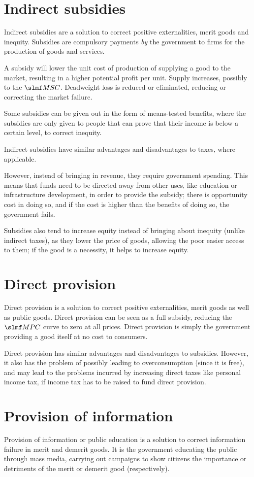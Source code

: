 \documentclass[Economics.tex]{subfiles}
\begin{document}
\section{Indirect subsidies}
Indirect subsidies are a solution to correct positive externalities, merit goods and inequity. Subsidies are compulsory payments \emph{by} the government to firms for the production of goods and services.

A subsidy will lower the unit cost of production of supplying a good to the market, resulting in a higher potential profit per unit. Supply increases, possibly to the \(\mrg{SC}\). Deadweight loss is reduced or eliminated, reducing or correcting the market failure.

Some subsidies can be given out in the form of means-tested benefits, where the subsidies are only given to people that can prove that their income is below a certain level, to correct inequity.

Indirect subsidies have similar advantages and disadvantages to taxes, where applicable.

However, instead of bringing in revenue, they require government spending. This means that funds need to be directed away from other uses, like education or infrastructure development, in order to provide the subsidy; there is opportunity cost in doing so, and if the cost is higher than the benefits of doing so, the government fails.

Subsidies also tend to increase equity instead of bringing about inequity (unlike indirect taxes), as they lower the price of goods, allowing the poor easier access to them; if the good is a necessity, it helps to increase equity.
\section{Direct provision}
Direct provision is a solution to correct positive externalities, merit goods as well as public goods. Direct provision can be seen as a full subsidy, reducing the \(\mrg{PC}\) curve to zero at all prices. Direct provision is simply the government providing a good itself at no cost to consumers.

Direct provision has similar advantages and disadvantages to subsidies. However, it also has the problem of possibly leading to overconsumption (since it is free), and may lead to the problems incurred by increasing direct taxes like personal income tax, if income tax has to be raised to fund direct provision.
\section{Provision of information}
Provision of information or public education is a solution to correct information failure in merit and demerit goods. It is the government educating the public through mass media, carrying out campaigns to show citizens the importance or detriments of the merit or demerit good (respectively).
\end{document}
